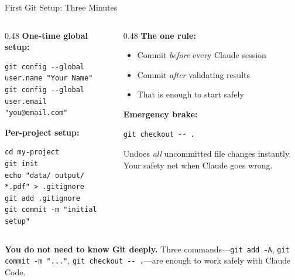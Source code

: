 \documentclass[10pt,english,aspectratio=169]{beamer}
\begin{document}
\begin{frame}[fragile]{First Git Setup: Three Minutes}

\begin{columns}[T]
\begin{column}{0.48\textwidth}
\textbf{One-time global setup:}
\begin{lstlisting}[style=pythonstyle,language={},basicstyle=\ttfamily\scriptsize,numbers=none]
git config --global user.name "Your Name"
git config --global user.email "you@email.com"
\end{lstlisting}

\vspace{0.2cm}

\textbf{Per-project setup:}
\begin{lstlisting}[style=pythonstyle,language={},basicstyle=\ttfamily\scriptsize,numbers=none]
cd my-project
git init
echo "data/ output/ *.pdf" > .gitignore
git add .gitignore
git commit -m "initial setup"
\end{lstlisting}
\end{column}
\begin{column}{0.48\textwidth}
\textbf{The one rule:}
\vspace{0.15cm}
\begin{itemize}
    \item Commit \textit{before} every Claude session
    \item Commit \textit{after} validating results
    \item That is enough to start safely
\end{itemize}

\vspace{0.25cm}

\textbf{Emergency brake:}
\begin{lstlisting}[style=pythonstyle,language={},basicstyle=\ttfamily\scriptsize,numbers=none]
git checkout -- .
\end{lstlisting}
Undoes \textit{all} uncommitted file changes instantly. Your safety net when Claude goes wrong.
\end{column}
\end{columns}

\vspace{0.2cm}

\footnotesize
\textbf{You do not need to know Git deeply.} Three commands---\texttt{git add -A}, \texttt{git commit -m "..."}, \texttt{git checkout -{-} .}---are enough to work safely with Claude Code.
\end{frame}
\end{document}
